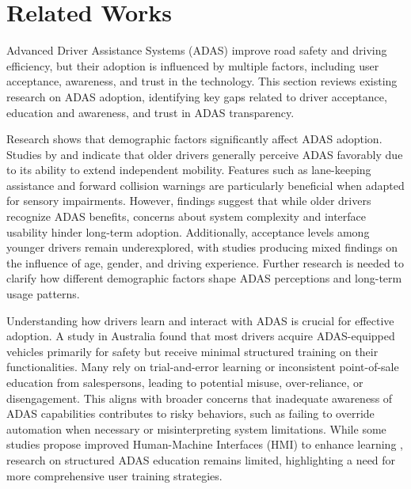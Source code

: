 \section{Related Works}
Advanced Driver Assistance Systems (ADAS) improve road safety and driving efficiency, but their adoption is influenced by multiple factors, including user acceptance, awareness, and trust in the technology. This section reviews existing research on ADAS adoption, identifying key gaps related to driver acceptance, education and awareness, and trust in ADAS transparency.

Research shows that demographic factors significantly affect ADAS adoption. Studies by \cite{davidse2006older} and \cite{wood2024exploring} indicate that older drivers generally perceive ADAS favorably due to its ability to extend independent mobility. Features such as lane-keeping assistance and forward collision warnings are particularly beneficial when adapted for sensory impairments. However, findings suggest that while older drivers recognize ADAS benefits, concerns about system complexity and interface usability hinder long-term adoption. Additionally, acceptance levels among younger drivers remain underexplored, with studies producing mixed findings on the influence of age, gender, and driving experience. Further research is needed to clarify how different demographic factors shape ADAS perceptions and long-term usage patterns.

Understanding how drivers learn and interact with ADAS is crucial for effective adoption. A study in Australia \cite{nandavar2023exploring} found that most drivers acquire ADAS-equipped vehicles primarily for safety but receive minimal structured training on their functionalities. Many rely on trial-and-error learning or inconsistent point-of-sale education from salespersons, leading to potential misuse, over-reliance, or disengagement. This aligns with broader concerns that inadequate awareness of ADAS capabilities contributes to risky behaviors, such as failing to override automation when necessary or misinterpreting system limitations. While some studies propose improved Human-Machine Interfaces (HMI) to enhance learning \cite{vaezipour2015reviewing}, research on structured ADAS education remains limited, highlighting a need for more comprehensive user training strategies.

